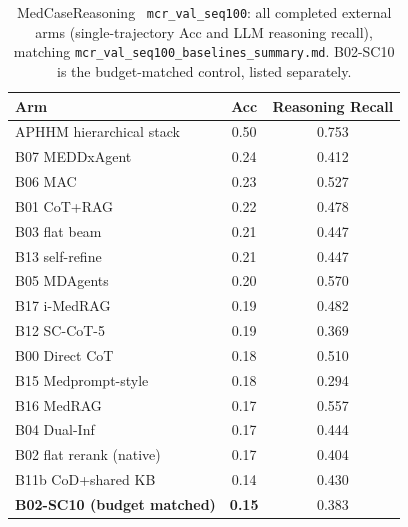 \begin{table}[t]
\centering
\scriptsize
\caption{MedCaseReasoning~\cite{medcasereasoning} \texttt{mcr\_val\_seq100}: all completed external arms (single-trajectory Acc and LLM reasoning recall), matching \texttt{mcr\_val\_seq100\_baselines\_summary.md}. B02-SC10 is the budget-matched control, listed separately.}
\label{tab:mcr-full}
\begin{tabular}{lcc}
\toprule
Arm & Acc & Reasoning Recall \\
\midrule
APHHM hierarchical stack & 0.50 & 0.753 \\
\midrule
B07 MEDDxAgent~\cite{meddxagent2025} & 0.24 & 0.412 \\
B06 MAC~\cite{chen2025mac,mac2026} & 0.23 & 0.527 \\
B01 CoT+RAG & 0.22 & 0.478 \\
B03 flat beam & 0.21 & 0.447 \\
B13 self-refine~\cite{madaan2023selfrefine} & 0.21 & 0.447 \\
B05 MDAgents~\cite{mdagents} & 0.20 & 0.570 \\
B17 i-MedRAG~\cite{imedrag} & 0.19 & 0.482 \\
B12 SC-CoT-5~\cite{wang2023selfconsistency} & 0.19 & 0.369 \\
B00 Direct CoT & 0.18 & 0.510 \\
B15 Medprompt-style~\cite{medprompt} & 0.18 & 0.294 \\
B16 MedRAG~\cite{medrag,xiong2024medrag} & 0.17 & 0.557 \\
B04 Dual-Inf~\cite{dualinf2025} & 0.17 & 0.444 \\
B02 flat rerank (native) & 0.17 & 0.404 \\
B11b CoD+shared KB~\cite{chainofdiagnosis} & 0.14 & 0.430 \\
\midrule
\textbf{B02-SC10 (budget matched)} & \textbf{0.15} & 0.383 \\
\bottomrule
\end{tabular}
\end{table}


